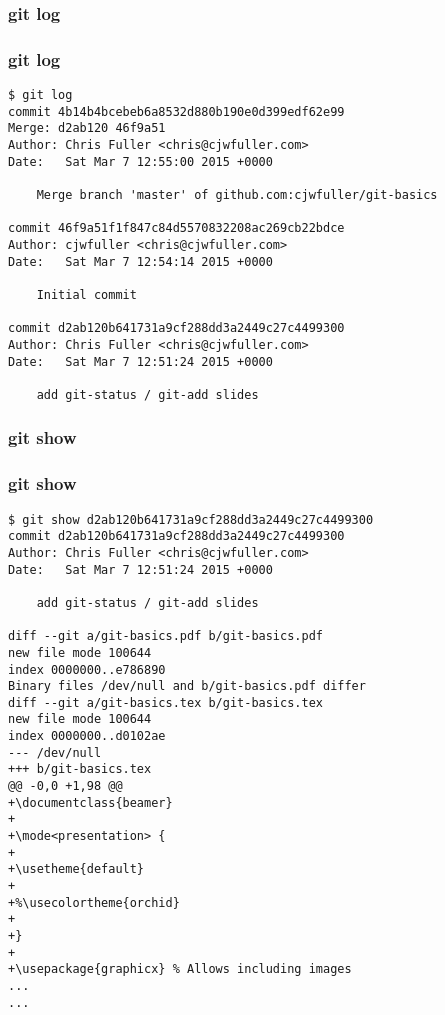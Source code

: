 \documentclass{beamer}
\begin{document}

\begin{frame}
\frametitle{git log}

\end{frame}


\begin{frame}[fragile]
\frametitle{git log}
	\scriptsize
	\begin{verbatim}
$ git log
commit 4b14b4bcebeb6a8532d880b190e0d399edf62e99
Merge: d2ab120 46f9a51
Author: Chris Fuller <chris@cjwfuller.com>
Date:   Sat Mar 7 12:55:00 2015 +0000

    Merge branch 'master' of github.com:cjwfuller/git-basics

commit 46f9a51f1f847c84d5570832208ac269cb22bdce
Author: cjwfuller <chris@cjwfuller.com>
Date:   Sat Mar 7 12:54:14 2015 +0000

    Initial commit

commit d2ab120b641731a9cf288dd3a2449c27c4499300
Author: Chris Fuller <chris@cjwfuller.com>
Date:   Sat Mar 7 12:51:24 2015 +0000

    add git-status / git-add slides
	\end{verbatim}
\end{frame}



\begin{frame}
\frametitle{git show}

\end{frame}


\begin{frame}[fragile]
\frametitle{git show}
	\tiny
	\begin{verbatim}
$ git show d2ab120b641731a9cf288dd3a2449c27c4499300
commit d2ab120b641731a9cf288dd3a2449c27c4499300
Author: Chris Fuller <chris@cjwfuller.com>
Date:   Sat Mar 7 12:51:24 2015 +0000

    add git-status / git-add slides

diff --git a/git-basics.pdf b/git-basics.pdf
new file mode 100644
index 0000000..e786890
Binary files /dev/null and b/git-basics.pdf differ
diff --git a/git-basics.tex b/git-basics.tex
new file mode 100644
index 0000000..d0102ae
--- /dev/null
+++ b/git-basics.tex
@@ -0,0 +1,98 @@
+\documentclass{beamer}
+
+\mode<presentation> {
+
+\usetheme{default}
+
+%\usecolortheme{orchid}
+
+}
+
+\usepackage{graphicx} % Allows including images
...
...
	\end{verbatim}
\end{frame}
\end{document}
